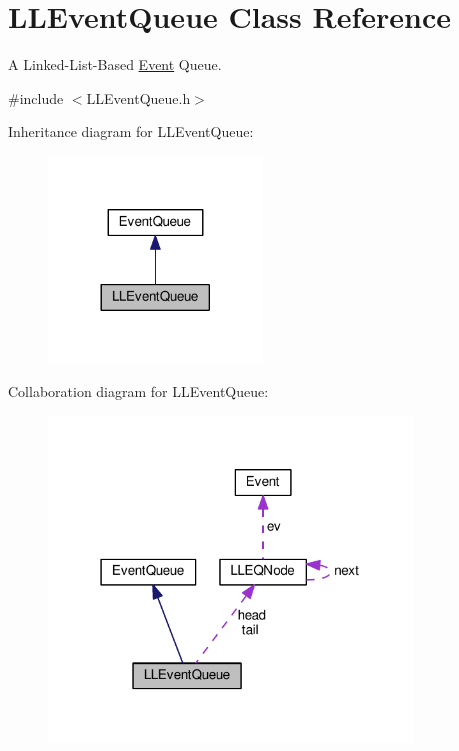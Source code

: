 \hypertarget{class_l_l_event_queue}{}\section{L\+L\+Event\+Queue Class Reference}
\label{class_l_l_event_queue}


A Linked-\/\+List-\/\+Based \hyperlink{struct_event}{Event} Queue.  




{\ttfamily \#include $<$L\+L\+Event\+Queue.\+h$>$}



Inheritance diagram for L\+L\+Event\+Queue\+:
\nopagebreak
\begin{figure}[H]
\begin{center}
\leavevmode
\includegraphics[width=161pt]{class_l_l_event_queue__inherit__graph}
\end{center}
\end{figure}


Collaboration diagram for L\+L\+Event\+Queue\+:
\nopagebreak
\begin{figure}[H]
\begin{center}
\leavevmode
\includegraphics[width=274pt]{class_l_l_event_queue__coll__graph}
\end{center}
\end{figure}
